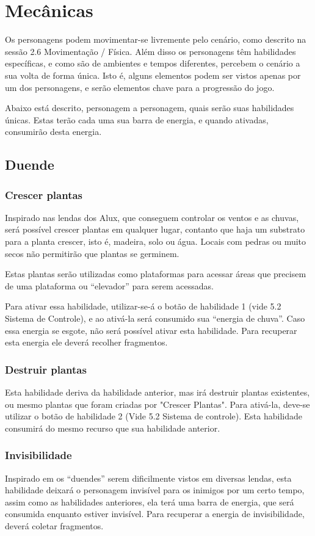 \section{Mecânicas}

Os personagens podem movimentar-se livremente pelo cenário, como descrito na sessão 2.6 Movimentação / Física. Além disso os personagens têm habilidades específicas, e como são de ambientes e tempos diferentes, percebem o cenário a sua volta de forma única. Isto é, alguns elementos podem ser vistos apenas por um dos personagens, e serão elementos chave para a progressão do jogo.

Abaixo está descrito, personagem a personagem, quais serão suas habilidades únicas. Estas terão cada uma sua barra de energia, e quando ativadas, consumirão desta energia.

\subsection{Duende}
\subsubsection{Crescer plantas}
Inspirado nas lendas dos Alux, que conseguem controlar os ventos e as chuvas, será possível crescer plantas em qualquer lugar, contanto que haja um substrato para a planta crescer, isto é,  madeira, solo ou água. Locais com pedras ou muito secos não permitirão que plantas se germinem.

Estas plantas serão utilizadas como plataformas para acessar áreas que precisem de uma plataforma ou ``elevador'' para serem acessadas.

Para ativar essa habilidade, utilizar-se-á o botão de habilidade 1 (vide 5.2 Sistema de Controle), e ao ativá-la será consumido sua ``energia de chuva''. Caso essa energia se esgote, não será possível ativar esta habilidade. Para recuperar esta energia ele deverá recolher fragmentos.


\subsubsection{Destruir plantas}
Esta habilidade deriva da habilidade anterior, mas irá destruir plantas existentes, ou mesmo plantas que foram criadas por "Crescer Plantas". Para ativá-la, deve-se utilizar o botão de habilidade 2 (Vide 5.2 Sistema de controle). Esta  habilidade consumirá do mesmo recurso que sua habilidade anterior. 


\subsubsection{Invisibilidade}
Inspirado em os ``duendes'' serem dificilmente vistos em diversas lendas, esta habilidade deixará o personagem invisível para os inimigos por um certo tempo, assim como as habilidades anteriores, ela terá uma barra de energia, que será consumida enquanto estiver invisível. Para recuperar a energia de invisibilidade, deverá coletar fragmentos.

